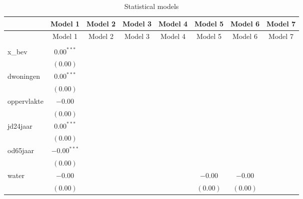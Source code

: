 
\begin{center}
\begin{longtable}{l c c c c c c c }
\hline
 & Model 1 & Model 2 & Model 3 & Model 4 & Model 5 & Model 6 & Model 7 \\
\hline
\endfirsthead
\hline
 & Model 1 & Model 2 & Model 3 & Model 4 & Model 5 & Model 6 & Model 7 \\
\hline
\endhead
\hline
\endfoot
\hline
\multicolumn{8}{l}{\scriptsize{$^{***}p<0.001$, $^{**}p<0.01$, $^*p<0.05$}}\\
\caption{Statistical models}
\label{table:coefficients}
\endlastfoot
x\_bev           & $0.00^{***}$  &             &              &               &               &               &               \\
                 & $(0.00)$      &             &              &               &               &               &               \\
dwoningen        & $0.00^{***}$  &             &              &               &               &               &               \\
                 & $(0.00)$      &             &              &               &               &               &               \\
oppervlakte      & $-0.00$       &             &              &               &               &               &               \\
                 & $(0.00)$      &             &              &               &               &               &               \\
jd24jaar         & $0.00^{***}$  &             &              &               &               &               &               \\
                 & $(0.00)$      &             &              &               &               &               &               \\
od65jaar         & $-0.00^{***}$ &             &              &               &               &               &               \\
                 & $(0.00)$      &             &              &               &               &               &               \\
water            & $-0.00$       &             &              &               & $-0.00$       & $-0.00$       &               \\
                 & $(0.00)$      &             &              &               & $(0.00)$      & $(0.00)$      &               \\

\end{longtable}
\end{center}
